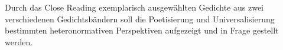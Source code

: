\begin{comment}
  [Kolodny1980]
  feministische literaturkritik wird anscheinend zur sau gemacht, weil sie kein system/program hat: "lack of systematic coherence"
  das ist auch gleichzeitig die stärke der bewegung: diversity, pluralism
  ``All the feminist is asserting, then, is her own equivalent
  right to liberate new (and perhaps different) significances from
  these same texts; and, at the same time, her right to choose which
  features of a text she takes as relevant because she is, after all, ask-
  ing new and different questions of it.''~\autocite{Kolodny1980}
  ``Robert Scholes, from whom I've been quoting, goes so far as to assert
  that "there is no single 'right' reading for any complex literary
  work,"''
  ``we entertain the possibility
  that different readings, even of the same text, may be differently
  useful, even illuminating, within different contexts of inquiry.''
  ``what we give up is simply the arrogance of
  claiming that our work is either exhaustive or definitive.''
  ``If feminist criticism calls anything into
  question, it must be that dog-eared myth of intellectual neutrality.''
\end{comment}

\begin{comment}
  * literatur/sprache shape our minds
  * wachsamkeit/Sensibilität schaffen fürs Erkennen patriarchalischen Projekte, die mittels "universelle Gefühle", "schöne Liebeslyrik" vermittelt werden/dafür verkauft werden

  immer noch zu schwammig..

  [Kolodny1980]
  Feminist Readings of male authors: discovering/exposing power relations men-women, that are taken for natural and granted


\end{comment}


Durch das Close Reading exemplarisch ausgewählten Gedichte aus zwei verschiedenen Gedichtsbändern soll die Poetisierung und Universalisierung bestimmten heteronormativen Perspektiven aufgezeigt und in Frage gestellt werden.

